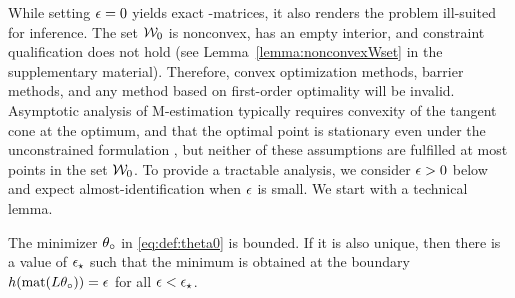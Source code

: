 
While setting $\epsilon=0$ yields exact \DAG-matrices, it also renders the problem ill-suited for inference. The set $\mathcal W_0$ is nonconvex, has  an empty interior, and constraint qualification does not hold (see Lemma~\ref{lemma:nonconvexWset} in the supplementary material). Therefore, convex optimization methods, barrier methods, and any method based on first-order optimality will be invalid. Asymptotic analysis of M-estimation typically requires convexity of the tangent cone at the optimum, and that the optimal point is stationary even under the unconstrained formulation \citep{geyer_asymptotics_1994,shapiro_asymptotics_2000}, but neither of these assumptions are fulfilled at most points in the set $\mathcal W_0$. To provide a tractable analysis, we consider $\epsilon>0$ below and expect almost-identification when $\epsilon$ is small. We start with a technical lemma.
\begin{lemma}
    \label{lemma:unconstrained_minimization}
    The minimizer $\theta_\circ$ in \eqref{eq:def:theta0} is bounded. If it is also unique, then there is a value of $\epsilon_\star$ such that the minimum is obtained at the boundary $h(\operatorname*{mat}(L\theta_\circ)) = \epsilon$ for all $\epsilon < \epsilon_\star$.
\end{lemma}

